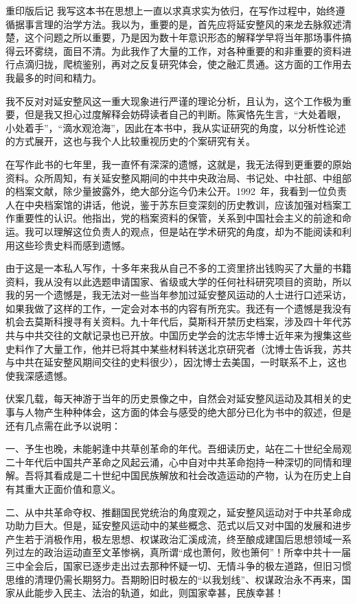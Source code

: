 \begin{pre-post-text}{重印版后记}
我写这本书在思想上一直以求真求实为依归，在写作过程中，始终遵循据事言理的治学方法。我以为，重要的是，首先应将延安整风的来龙去脉叙述清楚，这个问题之所以重要，乃是因为数十年意识形态的解释学早将当年那场事件搞得云环雾绕，面目不清。为此我作了大量的工作，对各种重要的和非重要的资料进行点滴归拢，爬梳鉴别，再对之反复研究体会，使之融汇贯通。这方面的工作用去我最多的时间和精力。

我不反对对延安整风这一重大现象进行严谨的理论分析，且认为，这个工作极为重要，但是我又担心过度解释会妨碍读者自己的判断。陈寅恪先生言，“大处着眼，小处着手”，“滴水观沧海”，因此在本书中，我从实证研究的角度，以分析性论述的方式展开，这也与我个人比较重视历史的个案研究有关。

在写作此书的七年里，我一直怀有深深的遗憾，这就是，我无法得到更重要的原始资料。众所周知，有关延安整风期间的中共中央政治局、书记处、中社部、中组部的档案文献，除少量披露外，绝大部分迄今仍未公开。1992~年，我看到一位负责人在中央档案馆的讲话，他说，鉴于苏东巨变深刻的历史教训，应该加强对档案工作重要性的认识。他指出，党的档案资料的保管，关系到中国社会主义的前途和命运。我可以理解这位负责人的观点，但是站在学术研究的角度，却为不能阅读和利用这些珍贵史料而感到遗憾。

由于这是一本私人写作，十多年来我从自己不多的工资里挤出钱购买了大量的书籍资料，我从没有以此选题申请国家、省级或大学的任何社科研究项目的资助，所以我的另一个遗憾是，我无法对一些当年参加过延安整风运动的人士进行口述采访，如果我做了这样的工作，一定会对本书的内容有所充实。我还有一个遗憾是我没有机会去莫斯科搜寻有关资料。九十年代后，莫斯科开禁历史档案，涉及四十年代苏共与中共交往的文献记录也已开放。中国历史学会的沈志华博士近年来为搜集这些史料作了大量工作，他并已将其中某些材料转送北京研究者（沈博士告诉我，苏共与中共在延安整风期间交往的史料很少），因沈博士去美国，一时联系不上，这也使我深感遗憾。

伏案几载，每天神游于当年的历史景像之中，自然会对延安整风运动及其相关的史事与人物产生种种体会，这方面的体会与感受的绝大部分已化为书中的叙述，但是还有几点需在此予以说明：

一、予生也晚，未能躬逢中共草创革命的年代。吾细读历史，站在二十世纪全局观二十年代后中国共产革命之风起云涌，心中自对中共革命抱持一种深切的同情和理解。吾将其看成是二十世纪中国民族解放和社会改造运动的产物，认为在历史上自有其重大正面价值和意义。

二、从中共革命夺权、推翻国民党统治的角度观之，延安整风运动对于中共革命成功助力巨大。但是，延安整风运动中的某些概念、范式以后又对中国的发展和进步产生若于消极作用，极左思想、权谋政治汇溪成流，终至酿成建国后思想领域一系列过左的政治运动直至文革惨祸，真所谓“成也萧何，败也箫何”！所幸中共十一届三中全会后，国家已逐步走出过去那种怀疑一切、无情斗争的极左道路，但旧习惯思维的清理仍需长期努力。吾期盼旧时极左的“以我划线”、权谋政治永不再来，国家从此能步入民主、法治的轨道，如此，则国家幸甚，民族幸甚！


\end{pre-post-text}
